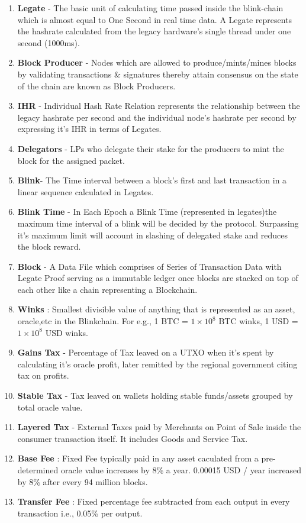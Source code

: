 \documentclass[letterpaper,11pt]{article}
\begin{document}
\begin{enumerate}[wide, labelwidth=!, labelindent=0pt]
\item \textbf{Legate} -  The basic unit of calculating time passed inside the blink-chain which is almost equal to One Second in real time data. A Legate represents the hashrate calculated from the legacy hardware's single thread under one second (1000ms). 
\item \textbf{Block Producer} - Nodes which are allowed to produce/mints/mines blocks by validating transactions \& signatures thereby attain consensus on the state of the chain are known as Block Producers.
\item \textbf{IHR} - Individual Hash Rate Relation represents the relationship between the legacy hashrate per second and the individual node's hashrate per second by expressing it's IHR in terms of Legates.
\item \textbf{Delegators} - LPs who delegate their stake for the producers to mint the block for the assigned packet.
\item \textbf{Blink}- The Time interval between a block's first and last transaction in a linear sequence calculated in Legates.
\item \textbf{Blink Time} - In Each Epoch a Blink Time (represented in legates)the maximum time interval of a blink will be decided by the protocol. Surpassing it's maximum limit will account in slashing of delegated stake and reduces the block reward.
\item \textbf{Block} - A Data File which comprises of Series of Transaction Data with Legate Proof serving as a immutable ledger once blocks are stacked on top of each other like a chain representing a Blockchain.
\item \textbf{Winks} : Smallest divisible value of anything that is represented as an asset, oracle,etc in the Blinkchain. For e.g., 1 BTC = $1 \times 10^8$ BTC winks, 1 USD = $1 \times 10^8$ USD winks.
\item \textbf{Gains Tax} - Percentage of Tax leaved on a UTXO when it's spent by calculating it's oracle profit, later remitted by the regional government citing tax on profits.
\item \textbf{Stable Tax} - Tax leaved on wallets holding stable funds/assets grouped by total oracle value.
\item \textbf{Layered Tax} - External Taxes paid by Merchants on Point of Sale inside the consumer transaction itself. It includes Goods and Service Tax.
\item \textbf{Base Fee} : Fixed Fee typically paid in any asset caculated from a pre-determined oracle value increases by 8\% a year. 0.00015 USD / year increased by 8\% after every 94 million blocks. 
\item \textbf{Transfer Fee} : Fixed percentage fee subtracted from each output in every transaction i.e., 0.05\% per output.
\end{enumerate}
\end{document}
